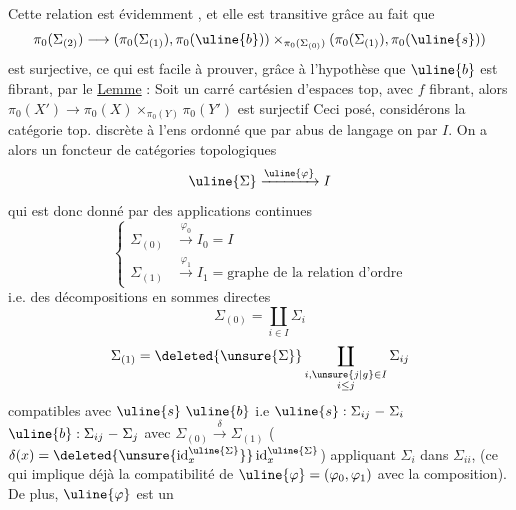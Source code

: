  Cette relation est évidemment , et
elle est transitive grâce au fait que
\[
\pi_0(\Sigma_{(2)})\longrightarrow
(\pi_0(\Sigma_{(1)}),\pi_0(\uline{b}))\times_{\pi_0(\Sigma_{(0)})}
(\pi_0(\Sigma_{(1)}),\pi_0(\uline{s}))
\]
est surjective, ce qui est facile à prouver,
grâce à l'hypothèse que $\uline{b}$ est fibrant, par le
\uline{Lemme} : Soit
un carré
cartésien d'espaces top, avec $f$ fibrant,
alors $\pi_0(X')\longrightarrow\pi_0(X)\times_{\pi_0(Y)}\pi_0(Y')$ est surjectif
Ceci posé, considérons la catégorie top. discrète 
à l'ens ordonné  que par abus de langage
on  par $I$. On a alors un foncteur
 de catégories topologiques 
\[
\uline{\Sigma}\xrightarrow{\uline{\varphi}}I
\]
qui est donc donné par des applications continues
\[
\left\{\begin{aligned}
\Sigma_{(0)}&\xrightarrow{\varphi_0}I_0=I\\
\Sigma_{(1)}&\xrightarrow{\varphi_1}I_1=\text{graphe de la relation d'ordre}
\end{aligned}\right.
\]
i.e. des décompositions en sommes directes
\[
\Sigma_{(0)}=\coprod_{i\in I}\Sigma_i
\]
\[
\Sigma_{(1)}=\deleted{\unsure{\Sigma}}\coprod_{\substack{i,\unsure{j|g}\in I\\i\leq j}}\Sigma_{ij}
\]
compatibles avec $\uline{s}\ \uline{b}$
i.e $\uline{s}:\Sigma_{ij}\mathrel{-}\Sigma_i$
$\uline{b}:\Sigma_{ij}\mathrel{-}\Sigma_j$
avec $\Sigma_{(0)}\xrightarrow{\delta}\Sigma_{(1)}$ ($\delta(x)=\deleted{\unsure{\operatorname{id}^{\uline{\Sigma}}_x}}\operatorname{id}^{\uline{\Sigma}}_x$)
appliquant $\Sigma_i$ dans $\Sigma_{ii}$,  (ce qui
implique déjà la compatibilité de $\uline{\varphi}=(\varphi_0,\varphi_1)$ avec
la composition). De plus, $\uline{\varphi}$ est un

